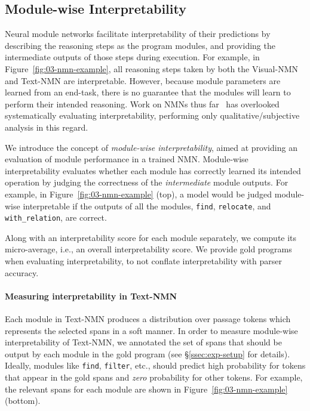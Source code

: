 \documentclass[main.tex]{subfiles}
\begin{document}
\subsection{Module-wise Interpretability}
\label{ssec:measure}
Neural module networks facilitate interpretability of their predictions by describing the reasoning steps as the program modules, and providing the intermediate outputs of those steps during execution.
For example, in Figure~\ref{fig:03-nmn-example}, all reasoning steps taken by both the Visual-NMN and Text-NMN are interpretable.
However, because module parameters are learned from an end-task, there is no guarantee that the modules will learn to perform their intended reasoning.
Work on NMNs thus far~\cite{explainablenmn-hu-2018,jiang-nmn-2019} has overlooked systematically evaluating interpretability, performing only qualitative/subjective analysis in this regard.

We introduce the concept of \textit{module-wise interpretability}, aimed at providing an evaluation of module performance in a trained NMN.
Module-wise interpretability evaluates whether each module has correctly learned its intended operation by judging the correctness of the \emph{intermediate} module outputs.
For example, in Figure~\ref{fig:03-nmn-example} (top), a model would be judged module-wise interpretable if the outputs of all the modules, \texttt{find}, \texttt{relocate}, and \texttt{with\_relation}, are correct.

Along with an interpretability score for each module separately, we compute its micro-average, i.e., an overall interpretability score.
We provide gold programs when evaluating interpretability, to not conflate  interpretability with parser accuracy.

\paragraph{Measuring interpretability in Text-NMN}
Each module in Text-NMN produces a distribution over passage tokens which represents the selected spans in a soft manner.
In order to measure module-wise interpretability of Text-NMN, we
annotated the set of spans that should be output by each module in the gold program (see \S\ref{ssec:exp-setup} for details).
Ideally, modules like \texttt{find}, \texttt{filter}, etc., should predict high probability for tokens that appear in the gold spans and \textit{zero} probability for other tokens. For example, the relevant spans for each module are shown in Figure~\ref{fig:03-nmn-example} (bottom).
\end{document}
